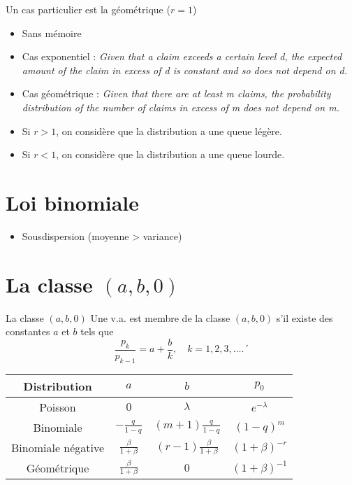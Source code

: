 Un cas particulier est la géométrique ($r = 1$)
\begin{itemize}
	\item Sans mémoire
	\item Cas exponentiel : \textit{Given that a claim exceeds a certain level d, the expected amount of the claim in excess of d is constant and so does not depend on d.}
	\item Cas géométrique : \textit{Given that there are at least m claims, the probability distribution of the number of claims in excess of m does not depend on m.}
	\item Si $r>1$, on considère que la distribution a une queue légère.
	\item Si $r<1$, on considère que la distribution a une queue lourde.
\end{itemize}

\section{Loi binomiale}

\begin{itemize}
	\item Sousdispersion (moyenne > variance)
\end{itemize}

\section{La classe $(a, b, 0)$}

\begin{definition}{La classe $(a, b, 0)$}{}
	Une v.a. est membre de la classe $(a, b, 0)$ s'il existe des constantes $a$ et $b$ tels que
	$$\frac{p_k}{p_{k-1}} = a + \frac{b}{k}, \quad k = 1, 2, 3, \dots.´$$
\end{definition}

\begin{center}
	\begin{tabular}{cccc}
		\hline
		   Distribution    &            $a$            &              $b$               &       $p_0$        \\ \hline
		     Poisson       &            $0$            &           $\lambda$            &   $e^{-\lambda}$   \\
		    Binomiale      &     $-\frac{q}{1-q}$      &     $(m + 1)\frac{q}{1-q}$     &     $(1-q)^m$      \\
		Binomiale négative & $\frac{\beta}{1 + \beta}$ & $(r-1)\frac{\beta}{1 + \beta}$ &  $(1+\beta)^{-r}$  \\
		   Géométrique     & $\frac{\beta}{1 + \beta}$ &              $0$               & $(1 + \beta)^{-1}$ \\ \hline
	\end{tabular}
\end{center}

